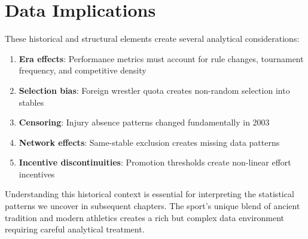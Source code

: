 \section{Data Implications}

These historical and structural elements create several analytical considerations:

\begin{enumerate}
\item \textbf{Era effects}: Performance metrics must account for rule changes, tournament frequency, and competitive density
\item \textbf{Selection bias}: Foreign wrestler quota creates non-random selection into stables
\item \textbf{Censoring}: Injury absence patterns changed fundamentally in 2003
\item \textbf{Network effects}: Same-stable exclusion creates missing data patterns
\item \textbf{Incentive discontinuities}: Promotion thresholds create non-linear effort incentives
\end{enumerate}

Understanding this historical context is essential for interpreting the statistical patterns we uncover in subsequent chapters. The sport's unique blend of ancient tradition and modern athletics creates a rich but complex data environment requiring careful analytical treatment.